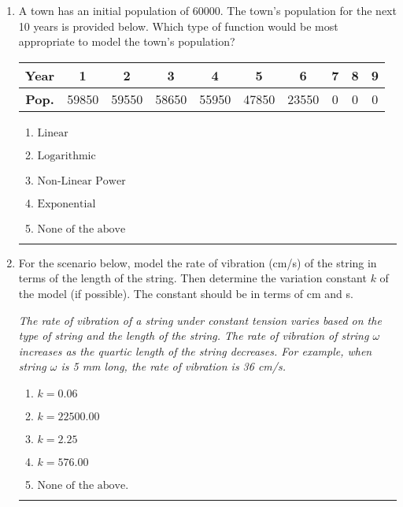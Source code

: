 \documentclass[14pt]{extbook}
\newcommand{\litem}[1]{\item#1\hspace*{-1cm}\rule{\textwidth}{0.4pt}}
\begin{document}
\begin{enumerate}
{\begin{enumerate}[label=\Alph*.]
\end{enumerate} }
\litem{
A town has an initial population of 60000. The town's population for the next 10 years is provided below. Which type of function would be most appropriate to model the town's population?


\begin{tabular}{c|c|c|c|c|c|c|c|c|c}
\textbf{Year} & 1 & 2 & 3 & 4 & 5 & 6 & 7 & 8 & 9 \tabularnewline
\hline
\textbf{Pop.} & 59850 & 59550 & 58650 & 55950 & 47850 & 23550 & 0 & 0 & 0
\end{tabular} \begin{enumerate}[label=\Alph*.]
\item \( \text{Linear} \)
\item \( \text{Logarithmic} \)
\item \( \text{Non-Linear Power} \)
\item \( \text{Exponential} \)
\item \( \text{None of the above} \)

\end{enumerate} }
\litem{
For the scenario below, model the rate of vibration (cm/s) of the string in terms of the length of the string. Then determine the variation constant $k$ of the model (if possible). The constant should be in terms of cm and s.
\begin{center}
    \textit{ The rate of vibration of a string under constant tension varies based on the type of string and the length of the string. The rate of vibration of string $\omega$ increases as the quartic length of the string decreases. For example, when string $\omega$ is 5 mm long, the rate of vibration is 36 cm/s. }
\end{center}
\begin{enumerate}[label=\Alph*.]
\item \( k = 0.06 \)
\item \( k = 22500.00 \)
\item \( k = 2.25 \)
\item \( k = 576.00 \)
\item \( \text{None of the above.} \)


\end{enumerate}}
\end{enumerate}
\end{document}
